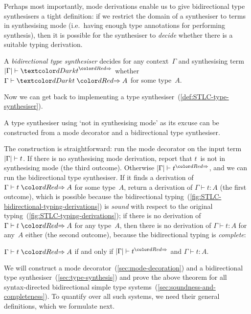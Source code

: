Perhaps most importantly, mode derivations enable us to give bidirectional type synthesisers a tight definition: if we restrict the domain of a synthesiser to terms in synthesising mode (i.e.~having enough type annotations for performing synthesis), then it is possible for the synthesiser to \emph{decide} whether there is a suitable typing derivation.

\begin{defn}
\label{def:STLC-bidirectional-type-synthesiser}
A \emph{bidirectional type synthesiser} decides for any context~$\Gamma$ and synthesising term $\erase\Gamma \vdash \isTerm{t}^{\syn}$ whether $\Gamma \vdash \isTerm{t} \syn A$ for some type~$A$.
\end{defn}

Now we can get back to implementing a type synthesiser~(\cref{def:STLC-type-synthesiser}).

\begin{theorem}\label{thm:implementation}
A type synthesiser using `not in synthesising mode' as its excuse can be constructed from a mode decorator and a bidirectional type synthesiser.
\end{theorem}

The construction is straightforward:
run the mode decorator on the input term~$\left|\Gamma\right| \vdash t$.
If there is no synthesising mode derivation, report that $t$~is not in synthesising mode (the third outcome).
Otherwise $\erase\Gamma \vdash t^{\syn}$, and we can run the bidirectional type synthesiser.
If it finds a derivation of $\Gamma \vdash t \syn A$ for some type~$A$, return a derivation of $\Gamma \vdash t : A$ (the first outcome), which is possible because the bidirectional typing~(\cref{fig:STLC-bidirectional-typing-derivations}) is \emph{sound} with respect to the original typing~(\cref{fig:STLC-typing-derivations}); if there is no derivation of $\Gamma \vdash t \syn A$ for any type~$A$, then there is no derivation of $\Gamma \vdash t : A$ for any~$A$ either (the second outcome), because the bidirectional typing is \emph{complete}:
\begin{theorem}
$\Gamma \vdash t \syn A$ if and only if $\erase\Gamma \vdash t^{\syn}$ and $\Gamma \vdash t : A$.
\end{theorem}
%
%

We will construct a mode decorator~(\cref{sec:mode-decoration}) and a bidirectional type synthesiser~(\cref{sec:type-synthesis}) and prove the above theorem for all syntax-directed bidirectional simple type systems~(\cref{sec:soundness-and-completeness}).
To quantify over all such systems, we need their general definitions, which we formulate next.

